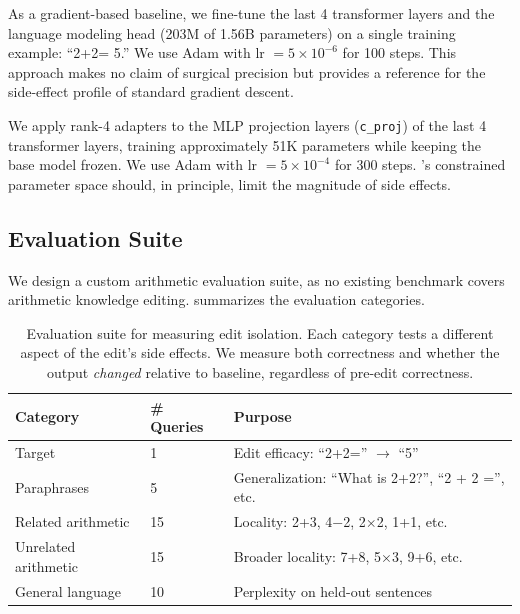 As a gradient-based baseline, we fine-tune the last 4 transformer layers and the language modeling head (203M of 1.56B parameters) on a single training example: ``2+2= 5.''
We use Adam with lr $= 5 \times 10^{-6}$ for 100 steps.
This approach makes no claim of surgical precision but provides a reference for the side-effect profile of standard gradient descent.

We apply rank-4 \lora adapters \citep{biderman2024lora} to the MLP projection layers (\texttt{c\_proj}) of the last 4 transformer layers, training approximately 51K parameters while keeping the base model frozen.
We use Adam with lr $= 5 \times 10^{-4}$ for 300 steps.
\lora's constrained parameter space should, in principle, limit the magnitude of side effects.

\subsection{Evaluation Suite}

We design a custom arithmetic evaluation suite, as no existing benchmark covers arithmetic knowledge editing.  summarizes the evaluation categories.

\begin{table}[t]
    \centering
    \caption{Evaluation suite for measuring edit isolation. Each category tests a different aspect of the edit's side effects. We measure both correctness and whether the output \emph{changed} relative to baseline, regardless of pre-edit correctness.}
    \begin{tabular}{@{}llp{5.5cm}@{}}
        \toprule
        \textbf{Category} & \textbf{\# Queries} & \textbf{Purpose} \\
        \midrule
        Target & 1 & Edit efficacy: ``2+2='' $\rightarrow$ ``5'' \\
        Paraphrases & 5 & Generalization: ``What is 2+2?'', ``2 + 2 ='', etc. \\
        Related arithmetic & 15 & Locality: 2+3, 4$-$2, 2$\times$2, 1+1, etc. \\
        Unrelated arithmetic & 15 & Broader locality: 7+8, 5$\times$3, 9+6, etc. \\
        General language & 10 & Perplexity on held-out sentences \\
        \bottomrule
    \end{tabular}
    \label{tab:eval_suite}
\end{table}

